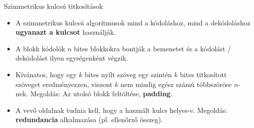 \documentclass[12 pt]{beamer}
\begin{document}
%
%
%
%

\begin{frame}{Szimmetrikus kulcsú titkosítások}
  \begin{itemize}
    \item{A szimmetrikus kulcsú algoritmusok mind a kódoláshoz, mind a dekódoláshoz \textbf{ugyanazt a kulcsot} használják.}
    \item{A blokk kódolók $n$ bites blokkokra bontják a bemenetet és a kódolást / dekódolást ilyen egységenként végzik.}
    \item{Kívánatos, hogy egy $k$ bites nyílt szöveg egy szintén $k$ bites titkosított szöveget eredményezzen, viszont $k$ nem mindig egész számú többszöröse $n$-nek. Megoldás: Az utolsó blokk feltöltése, \textbf{padding}.}
    \item{A vevő oldalnak tudnia kell, hogy a használt kulcs helyes-e. Megoldás: \textbf{redundancia} alkalmazása (pl. ellenőrző összeg).}
  \end{itemize}
\end{frame}
\end{document}
